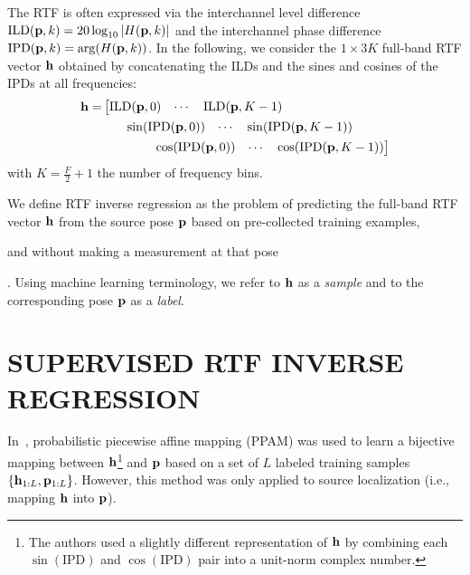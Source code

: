 \documentclass{article}
\newif\ifproofread
\newcommand{\pfmarker}[1]{%
\ifproofread
\textcolor{red}{#1}%
\else
#1%
\fi
}
\begin{document}
The RTF is often expressed via the interchannel level difference $\text{ILD}({\bf p}, k)=20\log_{10}|H({\bf p}, k)|$ and the interchannel phase difference $\text{IPD}({\bf p}, k)=\arg(H({\bf p}, k))$. In the following, we consider the $1\times 3K$ full-band RTF vector ${\bf h}$ obtained by concatenating the ILDs and the sines and cosines of the IPDs at all frequencies:
\begin{equation}
\label{eq:h}
\begin{aligned}
{\bf h}=&\left[\begin{matrix}\text{ILD}({\bf p}, 0) & \cdots & \text{ILD}({\bf p}, K-1)\end{matrix}\right.\\
&\qquad\begin{matrix}\sin(\text{IPD}({\bf p}, 0)) & \cdots & \sin(\text{IPD}({\bf p}, K-1))\end{matrix}\\
&\qquad\qquad\left.\begin{matrix}\cos(\text{IPD}({\bf p}, 0)) & \cdots & \cos(\text{IPD}({\bf p}, K-1))\end{matrix}\right]
\end{aligned}
\end{equation}
with $K=\frac{F}{2}+1$ the number of frequency bins.

We define RTF inverse regression as the problem of predicting the full-band RTF vector ${\bf h}$ from the source pose ${\bf p}$ based on pre-collected training examples, \pfmarker{and without making a measurement at that pose}. Using machine learning terminology, we refer to ${\bf h}$ as a \emph{sample} and to the corresponding pose ${\bf p}$ as a \emph{label}.


\section{SUPERVISED RTF INVERSE REGRESSION}
\label{sec:prior}
In~\cite{deleforge2015acoustic}, probabilistic piecewise affine mapping (PPAM) was used to learn a bijective mapping between ${\bf h}$\footnote{The authors used a slightly different representation of ${\bf h}$ by combining each $\sin(\text{IPD})$ and $\cos(\text{IPD})$ pair into a unit-norm complex number.} and ${\bf p}$ based on a set of $L$ labeled training samples $\{{\bf h}_{1:L}, {\bf p}_{1:L}\}$. However, this method was only applied to source localization (i.e., mapping ${\bf h}$ into ${\bf p}$).
\end{document}
